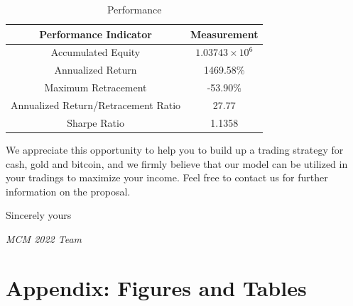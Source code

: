 \documentclass[12pt,a4paper]{article}
\begin{document}
\begin{spacing}{1.2}
	\begin{table}[H]
	\renewcommand{\arraystretch}{1.5}
	\caption{Performance}
	\label{table:memo_performance}
	\begin{center}
		{\footnotesize
			\begin{tabular}{c c }
				\toprule
				Performance Indicator & Measurement\\
				\midrule
				Accumulated Equity & $1.03743 \times 10^6$ \\
				Annualized Return & 1469.58\% \\
				Maximum Retracement & -53.90\% \\
				Annualized Return/Retracement Ratio & 27.77 \\
				Sharpe Ratio & 1.1358 \\
				\bottomrule
		\end{tabular}}
	\end{center}	
\end{table}


We appreciate this opportunity to help you to build up a trading strategy for cash, gold and bitcoin, and we firmly believe that our model can be utilized in your tradings to maximize your income. Feel free to contact us for further information on the proposal.

Sincerely yours

\textit{MCM 2022 Team}



\end{spacing}


\newpage
\appendix
\addtocounter{page}{-1}
\thispagestyle{empty}

\section*{Appendix: Figures and Tables}
\label{sec:AppendixFT}
\end{document}
